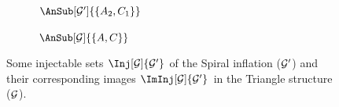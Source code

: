 \documentclass[aps, 10pt, english, twoside, pra, nofootinbib, tightenlines, longbibliography, superscriptaddress]{revtex4-1}
\begin{document}
\begin{nscenter}
\begin{figure}
\begin{subfigure}[b]{.23\linewidth}
    \caption{$\AnSub[\graph']{\bc{A_2, C_1}}$}\label{fig:spiral_inflation_inj2}
    \end{subfigure}
    \begin{subfigure}[b]{.23\linewidth}
    \caption{$\AnSub[\graph]{\bc{A,C}}$}\label{fig:spiral_inflation_iminj2}
    \end{subfigure}
    \caption{Some injectable sets $\Inj[\graph]{\graph'}$ of the Spiral inflation ($\mathcal{G}'$) and their corresponding images $\ImInj[\graph]{\graph'}$ in the Triangle structure ($\mathcal{G}$).}
    \label{fig:injectablesets}
    \end{figure}
    \end{nscenter}
\end{document}

